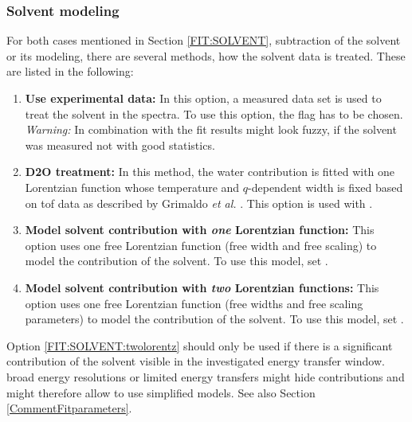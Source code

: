 \subsubsection{Solvent modeling}
\label{FIT:SOLVENT:MODEL}
For both cases mentioned in Section \ref{FIT:SOLVENT}, subtraction of the solvent or its modeling, there are several methods, how the solvent data is treated. These are listed in the following:

\begin{enumerate}
	\item \textbf{Use experimental data:}\label{FIT:SOLVENT:direct} In this option, a measured data set is used to treat the solvent in the spectra. To use this option, the flag  has to be chosen.\\
	\textit{Warning:} In combination with  the fit results might look fuzzy, if the solvent was measured not with good statistics.
	\item \label{FIT:SOLVENT:D2Ofixed}{\bf D2O treatment:} In this method, the water contribution is fitted with one Lorentzian function whose temperature and $q$-dependent width is fixed based on \gls{tof} data as described by Grimaldo \textit{et al.} \cite{Grimaldo_2015_EPJWebofConferences}. This option is used with .
	\item \label{FIT:SOLVENT:onelorentz}\textbf{Model solvent contribution with \textit{one} Lorentzian function:} This option uses one free Lorentzian function (free width and free scaling) to model the contribution of the solvent. To use this model, set .
	\item \label{FIT:SOLVENT:twolorentz}\textbf{Model solvent contribution with \textit{two} Lorentzian functions:} This option uses one free Lorentzian function (free widths and free scaling parameters) to model the contribution of the solvent. To use this model, set .
\end{enumerate}
Option \ref{FIT:SOLVENT:twolorentz} should only be used if there is a significant contribution of the solvent visible in the investigated energy transfer window. broad energy resolutions or limited energy transfers might hide contributions and might therefore allow to use simplified models. See also Section \ref{CommentFitparameters}.